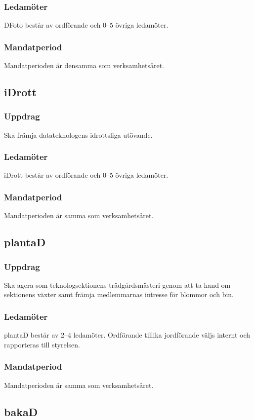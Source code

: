 \subsubsection{Ledamöter}
DFoto består av ordförande och 0--5 övriga ledamöter.
\subsubsection{Mandatperiod}
Mandatperioden är densamma som verksamhetsåret.

\subsection{iDrott}
\subsubsection{Uppdrag}
Ska främja datateknologens idrottsliga utövande. 
\subsubsection{Ledamöter}
iDrott består av ordförande och 0--5 övriga ledamöter. 
\subsubsection{Mandatperiod}
Mandatperioden är samma som verksamhetsåret. 

\subsection{plantaD}
\subsubsection{Uppdrag}
Ska agera som teknologsektionens trädgårdsmästeri genom att ta hand om sektionens växter samt främja medlemmarnas intresse för blommor och bin.
\subsubsection{Ledamöter}
plantaD består av 2--4 ledamöter. Ordförande tillika jordförande väljs internt och rapporteras till styrelsen.
\subsubsection{Mandatperiod}
Mandatperioden är samma som verksamhetsåret.

\subsection{bakaD}

